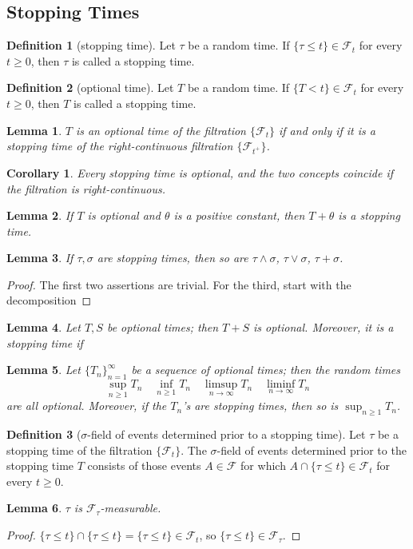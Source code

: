 \documentclass{article}
\newtheorem{Cor}{Corollary}[Thm]
\newtheorem{Lem}{Lemma}[section]
\theoremstyle{definition}
\newtheorem{Def}{Definition}[section]
\renewcommand{\leq}{\leqslant}
\renewcommand{\geq}{\geqslant}
\newcommand{\<}{\left\langle}
\renewcommand{\>}{\right\rangle}
\begin{document}
\subsection{Stopping Times}
\begin{Def}[stopping time]
    Let $\tau$ be a random time. If $\{\tau\leq t\}\in\mathcal{F}_t$ for every $t\geq 0$,
    then $\tau$ is called a stopping time.
\end{Def}
\begin{Def}[optional time]
    Let $T$ be a random time. If $\{T<t\}\in\mathcal{F}_t$ for every $t\geq 0$,
    then $T$ is called a stopping time.
\end{Def}
\begin{Lem}
    $T$ is an optional time of the filtration $\{\mathcal{F}_t\}$ if and only if it is a stopping time of the right-continuous
    filtration $\{\mathcal{F}_{t^+}\}$.
\end{Lem}
\begin{Cor}
    Every stopping time is optional, and the two concepts coincide if the filtration is right-continuous.
\end{Cor}
\begin{Lem}
    If $T$ is optional and $\theta$ is a positive constant, then $T+\theta$ is a stopping time.
\end{Lem}
\begin{Lem}
    If $\tau,\sigma$ are stopping times, then so are $\tau\wedge \sigma$, $\tau\vee \sigma$, $\tau+\sigma$.
\end{Lem}
\begin{proof}
    The first two assertions are trivial. \newline 
    For the third, start with the decomposition
\end{proof}
\begin{Lem}
    Let $T,S$ be optional times; then $T+S$ is optional. \newline
    Moreover, it is a stopping time if
\end{Lem}
\begin{Lem}
    Let $\{T_n\}_{n=1}^\infty$ be a sequence of optional times; then the random times 
    \[\sup_{n\geq 1}T_n\quad \inf_{n\geq 1}T_n\quad \limsup_{n\to\infty}T_n\quad \liminf_{n\to\infty}T_n \] 
    are all optional.\newline 
    Moreover, if the $T_n$'s are stopping times, then so is $\sup_{n\geq 1}T_n$.
\end{Lem}


\begin{Def}[$\sigma$-field of events determined prior to a stopping time]
    Let $\tau$ be a stopping time of the filtration $\{\mathcal{F}_t\}$. The $\sigma$-field of events determined prior to the stopping time $T$
    consists of those events $A\in\mathcal{F}$ for which $A\cap\{\tau\leq t\}\in \mathcal{F}_t$ for every $t\geq 0$.
\end{Def}
\begin{Lem}
    $\tau$ is $\mathcal{F}_\tau$-measurable.
\end{Lem}
\begin{proof}
    $\{\tau\leq t\}\cap\{\tau\leq t\}=\{\tau\leq t\}\in\mathcal{F}_t$, so $\{\tau\leq t\}\in \mathcal{F}_\tau$.
\end{proof}
\end{document}

